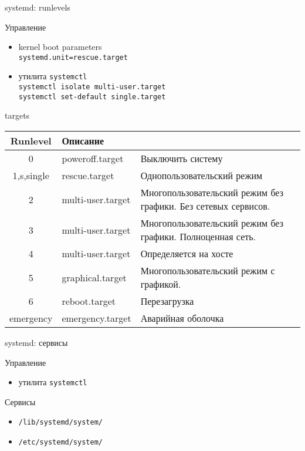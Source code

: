 \begin{frame}{systemd: runlevels}
	\begin{block}{Управление}
		\begin{itemize}
			\item kernel boot parameters\\
				{\tt systemd.unit=rescue.target} \\
			\item утилита {\tt systemctl} \\
				{\tt systemctl isolate multi-user.target} \\
				{\tt systemctl set-default single.target}
		\end{itemize}
	\end{block}

	\begin{block}{targets}
		\tiny
		\begin{table}
			\begin{tabular}{| c | l | l | }
			\hline
			Runlevel & Описание\\
			\hline
			0	& poweroff.target & Выключить систему \\
			1,s,single & rescue.target  & Однопользовательский режим \\
			2	& multi-user.target & Многопользовательский режим без графики. Без сетевых сервисов.\\
			3	& multi-user.target & Многопользовательский режим без графики. Полноценная сеть. \\
			4	& multi-user.target & Определяется на хосте\\
			5	& graphical.target & Многопользовательский режим с графикой.\\
			6	& reboot.target & Перезагрузка\\
			emergency & emergency.target & Аварийная оболочка \\
			\hline
			\end{tabular}
		\end{table}
	\end{block}
\end{frame}

\begin{frame}{systemd: сервисы}
	\begin{block}{Управление}
		\begin{itemize}
			\item утилита {\tt systemctl}
		\end{itemize}
	\end{block}

	\begin{block}{Сервисы}
		\begin{itemize}
			\item {\tt /lib/systemd/system/}
			\item {\tt /etc/systemd/system/}
		\end{itemize}
	\end{block}
\end{frame}
